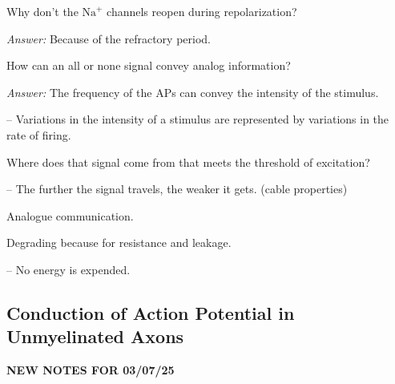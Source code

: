 \begin{coloredlist}
\begin{coloredlist}
\begin{coloredlist}
            \item Why don't the \(\text{Na}^{+}\) channels reopen during repolarization? \checkmark
            \begin{coloredlist}
                \item \textit{Answer:} Because of the refractory period.
            \end{coloredlist}
            \item How can an all or none signal convey analog information? \checkmark
            \begin{coloredlist}
                \item \textit{Answer:} The frequency of the APs can convey the intensity of the stimulus.
                \item {} -- Variations in the intensity of a stimulus are represented by variations in the rate of firing.
            \end{coloredlist}
            \item Where does that signal come from that meets the threshold of excitation?
            \begin{coloredlist}
                \item {} -- The further the signal travels, the weaker it gets. (cable properties)
                \begin{coloredlist}
                    \item Analogue communication.
                    \begin{coloredlist}
                        \item Degrading because for resistance and leakage.
                    \end{coloredlist}
                    \item {} -- No energy is expended.
                \end{coloredlist}
            \end{coloredlist}
        \end{coloredlist}
    \end{coloredlist}
\end{coloredlist}

\subsection{Conduction of Action Potential in Unmyelinated Axons}

\begin{center}
    \textbf{NEW NOTES FOR 03/07/25} \\
    \hrulefill
\end{center}

